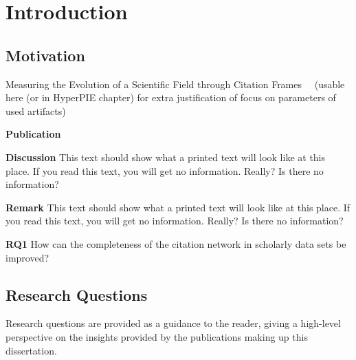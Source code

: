 \chapter{Introduction}
\label{chp:introduction}

\section{Motivation}


Measuring the Evolution of a Scientific Field through Citation Frames~~\cite{Jurgens2018} (usable here (or in HyperPIE chapter) for extra justification of focus on parameters of used artifacts)

\begin{infobox-pub}
\textbf{Publication} 
\end{infobox-pub}

\begin{infobox-discussion}
\textbf{Discussion} This text should show what a printed text will look like at this place. If you read this text, you will get no information. Really? Is there no information?
\end{infobox-discussion}

\begin{infobox-info}
\textbf{Remark} This text should show what a printed text will look like at this place. If you read this text, you will get no information. Really? Is there no information?
\end{infobox-info}

\begin{infobox-q}
\textbf{RQ1} How can the completeness of the citation network in scholarly data sets be improved?
\end{infobox-q}

\section{Research Questions}

Research questions are provided as a guidance to the reader, giving a high-level perspective on the insights provided by the publications making up this dissertation.

